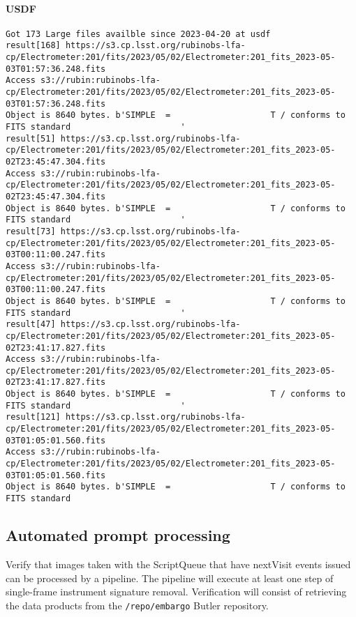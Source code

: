 \paragraph{USDF}
\begin{verbatim}
Got 173 Large files availble since 2023-04-20 at usdf
result[168] https://s3.cp.lsst.org/rubinobs-lfa-cp/Electrometer:201/fits/2023/05/02/Electrometer:201_fits_2023-05-03T01:57:36.248.fits
Access s3://rubin:rubinobs-lfa-cp/Electrometer:201/fits/2023/05/02/Electrometer:201_fits_2023-05-03T01:57:36.248.fits
Object is 8640 bytes. b'SIMPLE  =                    T / conforms to FITS standard                      '
result[51] https://s3.cp.lsst.org/rubinobs-lfa-cp/Electrometer:201/fits/2023/05/02/Electrometer:201_fits_2023-05-02T23:45:47.304.fits
Access s3://rubin:rubinobs-lfa-cp/Electrometer:201/fits/2023/05/02/Electrometer:201_fits_2023-05-02T23:45:47.304.fits
Object is 8640 bytes. b'SIMPLE  =                    T / conforms to FITS standard                      '
result[73] https://s3.cp.lsst.org/rubinobs-lfa-cp/Electrometer:201/fits/2023/05/02/Electrometer:201_fits_2023-05-03T00:11:00.247.fits
Access s3://rubin:rubinobs-lfa-cp/Electrometer:201/fits/2023/05/02/Electrometer:201_fits_2023-05-03T00:11:00.247.fits
Object is 8640 bytes. b'SIMPLE  =                    T / conforms to FITS standard                      '
result[47] https://s3.cp.lsst.org/rubinobs-lfa-cp/Electrometer:201/fits/2023/05/02/Electrometer:201_fits_2023-05-02T23:41:17.827.fits
Access s3://rubin:rubinobs-lfa-cp/Electrometer:201/fits/2023/05/02/Electrometer:201_fits_2023-05-02T23:41:17.827.fits
Object is 8640 bytes. b'SIMPLE  =                    T / conforms to FITS standard                      '
result[121] https://s3.cp.lsst.org/rubinobs-lfa-cp/Electrometer:201/fits/2023/05/02/Electrometer:201_fits_2023-05-03T01:05:01.560.fits
Access s3://rubin:rubinobs-lfa-cp/Electrometer:201/fits/2023/05/02/Electrometer:201_fits_2023-05-03T01:05:01.560.fits
Object is 8640 bytes. b'SIMPLE  =                    T / conforms to FITS standard
\end{verbatim}

\subsection{Automated prompt processing}
Verify that images taken with the ScriptQueue that have nextVisit events issued can be processed by a pipeline.
The pipeline will execute at least one step of single-frame instrument signature removal.
Verification will consist of retrieving the data products from the \texttt{/repo/embargo} Butler repository.

